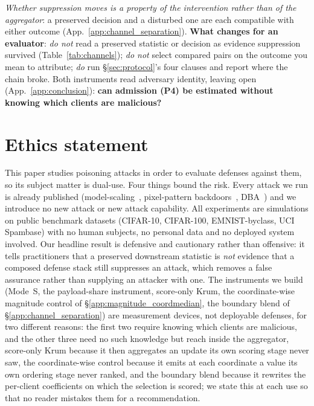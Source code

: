 \documentclass{article}
\begin{document}
\noindent \emph{Whether suppression moves is a property of the intervention rather than of the aggregator}: a preserved decision and a disturbed one are each compatible with either outcome (App.~\ref{app:channel_separation}). \textbf{What changes for an evaluator}: \emph{do not} read a preserved statistic or decision as evidence suppression survived (Table~\ref{tab:channels}); \emph{do not} select compared pairs on the outcome you mean to attribute; \emph{do} run §\ref{sec:protocol}'s four clauses and report where the chain broke. Both instruments read adversary identity, leaving open (App.~\ref{app:conclusion}): \textbf{can admission (P4) be estimated without knowing which clients are malicious?}

\section*{Ethics statement}

This paper studies poisoning attacks in order to evaluate defenses against them, so its
subject matter is dual-use. Four things bound the risk. Every attack we run is already
published (model-scaling~\citep{bagdasaryan2020backdoor}, pixel-pattern
backdoors~\citep{chen2017targeted}, DBA~\citep{xie2019dba}) and we introduce no new attack
or new attack capability. All experiments are simulations on public benchmark datasets
(CIFAR-10, CIFAR-100, EMNIST-byclass, UCI Spambase) with no human subjects, no personal data and no
deployed system involved. Our headline result is defensive and cautionary rather than
offensive: it tells practitioners that a preserved downstream statistic is \emph{not}
evidence that a composed defense stack still suppresses an attack, which removes a false
assurance rather than supplying an attacker with one. The instruments we build (Mode~S, the
payload-share instrument, score-only Krum, the coordinate-wise magnitude control of
§\ref{app:magnitude_coordmedian}, the boundary blend of
§\ref{app:channel_separation}) are measurement devices, not deployable defenses, for two
different reasons: the first two require knowing which clients are malicious, and the other three
need no such knowledge but reach inside the aggregator, score-only Krum because it then aggregates
an update its own scoring stage never saw, the coordinate-wise control because it emits at each
coordinate a value its own ordering stage never ranked, and the boundary blend because it rewrites the
per-client coefficients on which the selection is scored; we state this at each use so that no reader
mistakes them for a recommendation.
\end{document}

